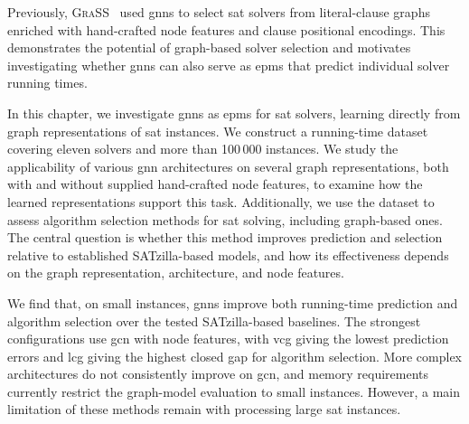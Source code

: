Previously, \textsc{GraSS}~\citep{ZhaEtAl24b} used \glspl{gnn} to select \gls{sat} solvers from literal-clause graphs enriched with hand-crafted node features and clause positional encodings. This demonstrates the potential of graph-based solver selection and motivates investigating whether \glspl{gnn} can also serve as \glspl{epm} that predict individual solver running times.

In this chapter, we investigate \glspl{gnn} as \glspl{epm} for \gls{sat} solvers, learning directly from graph representations of \gls{sat} instances. We construct a running-time dataset covering eleven solvers and more than 100\,000 instances. We study the applicability of various \gls{gnn} architectures on several graph representations, both with and without supplied hand-crafted node features, to examine how the learned representations support this task. Additionally, we use the dataset to assess algorithm selection methods for \gls{sat} solving, including graph-based ones. The central question is whether this method improves prediction and selection relative to established SATzilla-based models, and how its effectiveness depends on the graph representation, architecture, and node features.

We find that, on small instances, \glspl{gnn} improve both running-time prediction and algorithm selection over the tested SATzilla-based baselines. The strongest configurations use \gls{gcn} with node features, with \gls{vcg} giving the lowest prediction errors and \gls{lcg} giving the highest closed gap for algorithm selection. More complex architectures do not consistently improve on \gls{gcn}, and memory requirements currently restrict the graph-model evaluation to small instances. However, a main limitation of these methods remain with processing large \gls{sat} instances.


